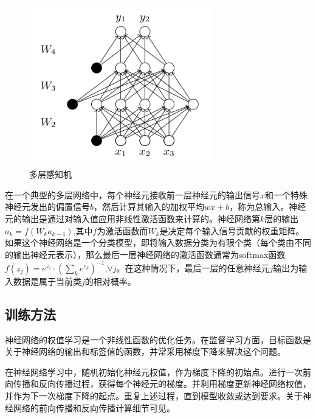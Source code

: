 \documentclass[zihao = -4,cn]{oucart}
\begin{document}
\begin{figure}[h]
	\centering %
	\includegraphics[width=8cm,height=7cm]{assets/MLP}
	\caption{多层感知机}
	\label{fig:MLP}
\end{figure}

在一个典型的多层网络中，每个神经元接收前一层神经元的输出信号$x$和一个特殊神经元发出的偏置信号$b$，然后计算其输入的加权平均$wx+b$，称为总输入。神经元的输出是通过对输入值应用非线性激活函数来计算的。神经网络第$k$层的输出$a_k = f(W_ka_{k-1})$,其中$f$为激活函数而$W_k$是决定每个输入信号贡献的权重矩阵。如果这个神经网络是一个分类模型，即将输入数据分类为有限个类（每个类由不同的输出神经元表示），那么最后一层神经网络的激活函数通常为softmax函数$f(z_j)=e^{z_j}\cdot(\sum_k{e^{z_k}})^{-1}$,$\forall{j}$。在这种情况下，最后一层的任意神经元$j$输出为输入数据是属于当前类$j$的相对概率。\par

\subsection{训练方法}
神经网络的权值学习是一个非线性函数的优化任务。在监督学习方面，目标函数是关于神经网络的输出和标签值的函数，并常采用梯度下降来解决这个问题。\par
在神经网络学习中，随机初始化神经元权值，作为梯度下降的初始点。进行一次前向传播和反向传播过程，获得每个神经元的梯度。并利用梯度更新神经网络权值，并作为下一次梯度下降的起点。重复上述过程，直到模型收敛或达到要求。关于神经网络的前向传播和反向传播计算细节可见\cite{周志华2016机器学习}。 \par
\end{document}
